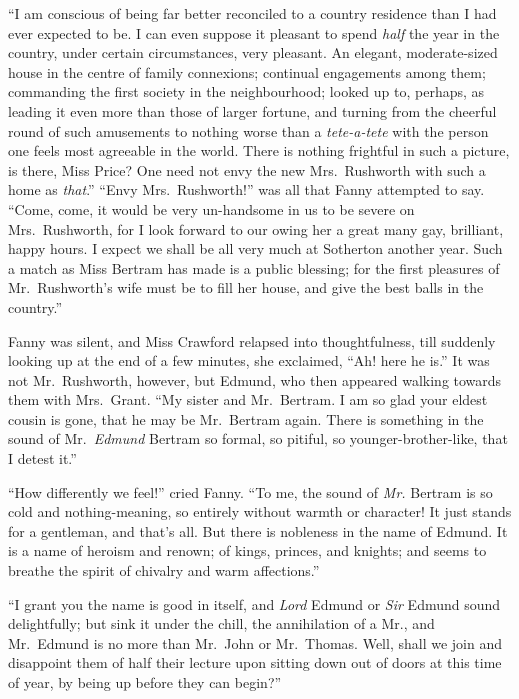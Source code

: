 ``I am conscious of being far better reconciled to a country
residence than I had ever expected to be.  I can even
suppose it pleasant to spend \emph{half} the year in the country,
under certain circumstances, very pleasant.  An elegant,
moderate-sized house in the centre of family connexions;
continual engagements among them; commanding the first society
in the neighbourhood; looked up to, perhaps, as leading
it even more than those of larger fortune, and turning
from the cheerful round of such amusements to nothing
worse than a \emph{tete-a-tete} with the person one feels
most agreeable in the world.  There is nothing frightful
in such a picture, is there, Miss Price?  One need not
envy the new Mrs.\ Rushworth with such a home as \emph{that}.''
``Envy Mrs.\ Rushworth!'' was all that Fanny attempted to say.
``Come, come, it would be very un-handsome in us to be
severe on Mrs.\ Rushworth, for I look forward to our owing
her a great many gay, brilliant, happy hours.  I expect
we shall be all very much at Sotherton another year.
Such a match as Miss Bertram has made is a public blessing;
for the first pleasures of Mr.\ Rushworth's wife must be to
fill her house, and give the best balls in the country.''

Fanny was silent, and Miss Crawford relapsed into
thoughtfulness, till suddenly looking up at the end
of a few minutes, she exclaimed, ``Ah! here he is.''
It was not Mr.\ Rushworth, however, but Edmund,
who then appeared walking towards them with Mrs.\ Grant.
``My sister and Mr.\ Bertram.  I am so glad your eldest
cousin is gone, that he may be Mr.\ Bertram again.  There is
something in the sound of Mr.\ \emph{Edmund} Bertram so formal,
so pitiful, so younger-brother-like, that I detest it.''

``How differently we feel!'' cried Fanny.  ``To me,
the sound of \emph{Mr.} Bertram is so cold and nothing-meaning,
so entirely without warmth or character!  It just stands
for a gentleman, and that's all.  But there is nobleness
in the name of Edmund.  It is a name of heroism and renown;
of kings, princes, and knights; and seems to breathe
the spirit of chivalry and warm affections.''

``I grant you the name is good in itself, and \emph{Lord} Edmund
or \emph{Sir} Edmund sound delightfully; but sink it under the chill,
the annihilation of a Mr., and Mr.\ Edmund is no more than
Mr.\ John or Mr.\ Thomas.  Well, shall we join and disappoint
them of half their lecture upon sitting down out of doors
at this time of year, by being up before they can begin?''

